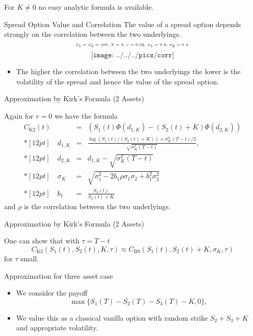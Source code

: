 For $K\neq 0$ no easy analytic formula is available.





{Spread Option Value and Correlation}
The value of a spread option depends strongly on the correlation between the two underlyings.
$$\tiny\text{$S_1=S_2=100$, $T=3$, $r=0.02$, $\sigma_1=0.6$, $\sigma_2=0.4$.}$$
\vspace{-0.76cm}
$$\texttt{[image: ../../../pics/corr]}$$
\begin{itemize}
\vspace{-1cm}
\item The higher the correlation between the two underlyings the lower is the volatility of the spread and hence the value of the spread option.
\end{itemize}




{Approximation by Kirk's Formula (2 Assets)}

Again for $r=0$ we have the formula $$\begin{array}{lll}
 C_{\mbox{K2}}(t) & = & (S_1(t)\Phi(d_{1,K})-(S_2(t)+K)\Phi(d_{2,K}))
 \\*[12pt]
 \quad d_{1,K} & = & \frac{\log(S_1(t)/(S_2(t)+K))+\sigma_K^{2}(T-t)/2}{\sqrt{\sigma_K^{2}(T-t)}},\\*[12pt]
  \quad d_{2,K} &=&d_{1,K}-\sqrt{\sigma_K^{2}(T-t)}
 \\*[12pt]
 \quad \sigma_K & = & \sqrt{\sigma_1^2-2b_1\rho\sigma_1\sigma_2+b_1^2\sigma_2^2}\\*[12pt]
 \quad b_1 &=& \frac{S_2(t)}{S_2(t)+K}
\end{array}$$
and $\rho$ is the correlation between the two underlyings.



{Approximation by Kirk's Formula (2 Assets)}

One can show that with $\tau=T-t$
$$
 C_{\mbox{K2}}(S_1(t), S_2(t), K, \tau) \approx
 C_{\mbox{BS}}(S_1(t), S_2(t)+K, \sigma_K, \tau)
 $$
  for  $\tau$ small.




{Approximation for three asset case}
\begin{itemize}
\item<1-> We consider the payoff
\begin{equation}
\max\{S_1(T) - S_2(T)- S_3(T)-K, 0\},
\label{Three_asset_value}
\end{equation}
\item<2-> We value this as a classical vanilla option with random strike $S_2+S_3+K$ and appropriate volatility.
\end{itemize}




